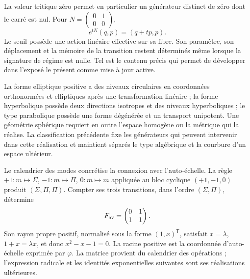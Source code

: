 La valeur tritique zéro permet en particulier un générateur distinct de
zéro dont le carré est nul. Pour
\(N=\left(\begin{smallmatrix}0&1\\0&0\end{smallmatrix}\right)\),
\[
 e^{tN}(q,p)=(q+tp,p).
\]
Le seuil possède une action linéaire effective sur sa fibre. Son paramètre,
son déplacement et la mémoire de la transition restent déterminés
même lorsque la signature de régime est nulle. Tel est le contenu précis qui
permet de développer dans l’exposé le présent comme mise à jour active.

La forme elliptique positive a des niveaux circulaires en coordonnées
orthonormées et elliptiques après une transformation linéaire ; la forme hyperbolique
possède deux directions isotropes et des niveaux hyperboliques ; le type parabolique
possède une forme dégénérée et un transport unipotent. Une géométrie sphérique
requiert en outre l’espace homogène ou la métrique qui la réalise. La
classification précédente fixe les générateurs qui peuvent intervenir dans cette
réalisation et maintient séparés le type algébrique et la courbure d’un
espace ultérieur.

Le calendrier des modes concrétise la connexion avec l'auto-échelle. La règle \(+1:m\mapsto\Sigma\), \(-1:m\mapsto\Pi\), \(0:m\mapsto m\) appliquée au bloc cyclique \((+1,-1,0)\) produit \((\Sigma,\Pi,\Pi)\). Compter ses trois transitions, dans l'ordre \((\Sigma,\Pi)\), détermine
\begin{equation}
 F_{\rm av}=\begin{pmatrix}0&1\\1&1\end{pmatrix}.
 \label{eq:geo-fav}
\end{equation}
Son rayon propre positif, normalisé sous la forme \((1,x)^\mathsf T\), satisfait \(x=\lambda\), \(1+x=\lambda x\), et donc \(x^2-x-1=0\). La racine positive est la coordonnée d'auto-échelle exprimée par \(\varphi\). La matrice provient du calendrier des opérations ; l'expression radicale et les identités exponentielles suivantes sont ses réalisations ultérieures.


